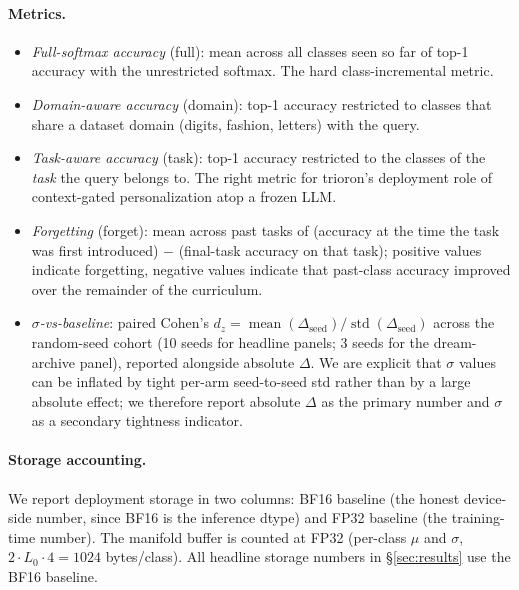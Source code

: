 \documentclass[11pt]{article}
\begin{document}
\paragraph{Metrics.}
\begin{itemize}[leftmargin=1.5em]
  \item \emph{Full-softmax accuracy} (full): mean across all classes
        seen so far of top-1 accuracy with the unrestricted softmax.
        The hard class-incremental metric.
  \item \emph{Domain-aware accuracy} (domain): top-1 accuracy
        restricted to classes that share a dataset domain (digits,
        fashion, letters) with the query.
  \item \emph{Task-aware accuracy} (task): top-1 accuracy restricted
        to the classes of the \emph{task} the query belongs to. The
        right metric for trioron's deployment role of context-gated
        personalization atop a frozen LLM.
  \item \emph{Forgetting} (forget): mean across past tasks of
        (accuracy at the time the task was first introduced) $-$
        (final-task accuracy on that task); positive values indicate
        forgetting, negative values indicate that past-class accuracy
        improved over the remainder of the curriculum.
  \item \emph{$\sigma$-vs-baseline}: paired Cohen's
        $d_z = \operatorname{mean}(\Delta_{\text{seed}}) /
        \operatorname{std}(\Delta_{\text{seed}})$ across the
        random-seed cohort (10 seeds for headline panels; 3 seeds for
        the dream-archive panel), reported alongside absolute
        $\Delta$. We are explicit that $\sigma$ values can be inflated
        by tight per-arm seed-to-seed std rather than by a large
        absolute effect; we therefore report absolute $\Delta$ as the
        primary number and $\sigma$ as a secondary tightness
        indicator.
\end{itemize}

\paragraph{Storage accounting.}
We report deployment storage in two columns: BF16 baseline (the honest
device-side number, since BF16 is the inference dtype) and FP32
baseline (the training-time number). The manifold buffer is counted at
FP32 (per-class $\mu$ and $\sigma$, $2 \cdot L_0 \cdot 4 = 1024$
bytes/class). All headline storage numbers in
\S\ref{sec:results} use the BF16 baseline.
\end{document}
